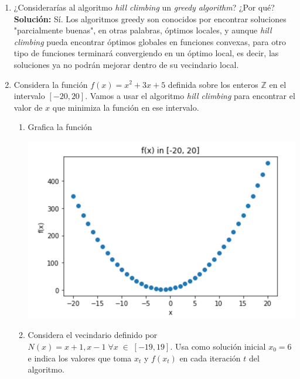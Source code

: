 \documentclass[10pt,letterpaper]{article}
\begin{document}
\begin{enumerate}
        \item ¿Considerarías al algoritmo \textit{hill climbing} un \textit{greedy algorithm}?
              ¿Por qué? \\

              \textbf{Solución:} Sí. Los algoritmos greedy son conocidos por encontrar
              soluciones "parcialmente buenas", en otras palabras, óptimos locales, y
              aunque \textit{hill climbing} pueda encontrar óptimos globales en funciones
              convexas, para otro tipo de funciones terminará convergiendo en un óptimo
              local, es decir, las soluciones ya no podrán mejorar dentro de su vecindario
              local.

        \clearpage

        \item Considera la función $f(x) = x^2 + 3x + 5$ definida sobre los enteros
              $\mathbb{Z}$ en el intervalo $[-20, 20]$. Vamos a usar el algoritmo
              \textit{hill climbing} para encontrar el valor de $x$ que minimiza
              la función en ese intervalo.

              \begin{enumerate}
                  \item Grafica la función
                        \begin{center}
                            \includegraphics[scale=.5]{assets/theory/5-a/f-plot.png}
                        \end{center}
                  \item Considera el vecindario definido por
                  $N(x) = {x + 1, x - 1} \; \forall x \; \in \; [-19, 19]$. Usa
                  como solución inicial $x_0=6$ e indica los valores que toma
                  $x_t$ y $f(x_t)$ en cada iteración $t$ del algoritmo.
              \end{enumerate}


\end{enumerate}
\end{document}
